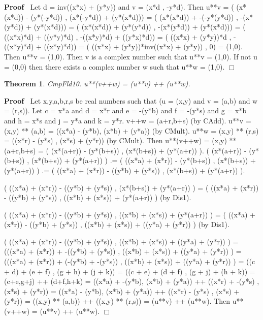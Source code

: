 \documentclass{article}
\newenvironment{forthel}{\begin{leftbar}}{\end{leftbar}}
\newenvironment{proof}{\noindent\textbf{Proof\ }}{\hspace*{\fill}$\Box$\medskip}
\newtheorem{theorem}{Theorem}
\begin{document}
\begin{forthel}
\begin{proof}
Let d = inv((x*x) + (y*y)) and 
v = (x*d , -y*d). 
Then u**v = ( (x*(x*d)) - (y*(-y*d)) , (x*(-y*d)) + (y*(x*d)))
= ( (x*(x*d)) + -(-y*(y*d)) , -(x*(y*d)) + (y*(x*d)))
= ( (x*(x*d)) + (y*(y*d)) , -(x*(y*d)) + (y*(x*d)))
= ( ((x*x)*d) + ((y*y)*d) , -((x*y)*d) + ((y*x)*d))
= ( ((x*x) + (y*y))*d , -((x*y)*d) + ((x*y)*d))
= ( ((x*x) + (y*y))*inv((x*x) + (y*y)) , 0)
= (1,0).
Then u**v = (1,0).
Then v is a complex number such that u**v = (1,0).
If not u = (0,0) then there exists a complex number w such that u**w = (1,0).
\end{proof}





\begin{theorem}
 CmpFld10. u**(v++w) = (u**v) ++ (u**w).
\end{theorem}\begin{proof}
	Let x,y,a,b,r,s be real numbers such that (u = (x,y) and v = (a,b) and w = (r,s)).
Let c = x*a and d = x*r and e = -(y*b) and f = -(y*s) and g = x*b and  h = x*s and  j = y*a and k = y*r.
v++w = (a+r,b+s) (by CAdd).
u**v = (x,y) ** (a,b) = ((x*a) - (y*b), (x*b) + (y*a)) (by CMult).  
u**w = (x,y) ** (r,s) = ((x*r) - (y*s) , (x*s) + (y*r)) (by CMult). 
Then u**(v++w) 	= (x,y) ** (a+r,b+s) = ( (x*(a+r)) - (y*(b+s)) , (x*(b+s)) + (y*(a+r)) ).
( (x*(a+r)) - (y*(b+s)) , (x*(b+s)) + (y*(a+r)) )
.= ( ((x*a) + (x*r)) - (y*(b+s)) , (x*(b+s)) + (y*(a+r)) )
.= ( ((x*a) + (x*r)) - ((y*b) + (y*s)) , (x*(b+s)) + (y*(a+r)) ).

( ((x*a) + (x*r)) - ((y*b) + (y*s)) , (x*(b+s)) + (y*(a+r)) )
= ( ((x*a) + (x*r)) - ((y*b) + (y*s)) , ((x*b) + (x*s)) + (y*(a+r)) ) (by Dis1).

( ((x*a) + (x*r)) - ((y*b) + (y*s)) , ((x*b) + (x*s)) + (y*(a+r)) )
= ( ((x*a) + (x*r)) - ((y*b) + (y*s)) , ((x*b) + (x*s)) + ((y*a) + (y*r)) ) (by Dis1).

( ((x*a) + (x*r)) - ((y*b) + (y*s)) , ((x*b) + (x*s)) + ((y*a) + (y*r)) )
= (((x*a) + (x*r)) + -((y*b) + (y*s)) , ((x*b) + (x*s)) + ((y*a) + (y*r)) )
= (((x*a) + (x*r)) + (-(y*b) + -(y*s)) , ((x*b) + (x*s)) + ((y*a) + (y*r)) )
= ((c + d) + (e + f) , (g + h) + (j + k))
= ((c + e) + (d + f) , (g + j) + (h + k))
= (c+e,g+j) ++ (d+f,h+k)
= ((x*a) + -(y*b), (x*b) + (y*a)) ++ ((x*r) + -(y*s) , (x*s) + (y*r))
= ((x*a) - (y*b), (x*b) + (y*a)) ++ ((x*r) - (y*s) , (x*s) + (y*r))
= ((x,y) ** (a,b)) ++ ((x,y) ** (r,s)) 
= (u**v) ++ (u**w).
Then u**(v++w) = (u**v) ++ (u**w).
\end{proof}



\end{forthel}
\end{document}
